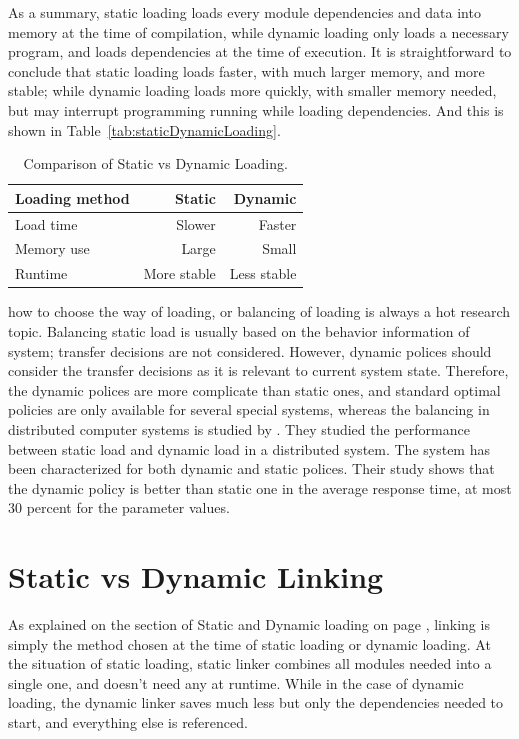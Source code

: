 \documentclass[doc,natbib,12pt]{apa6}
\begin{document}
	As a summary, static loading loads every module dependencies and data into memory at the time of compilation, while dynamic loading only loads a necessary program, and loads dependencies at the time of execution. It is straightforward to conclude that static loading loads faster, with much larger memory, and more stable; while dynamic loading loads more quickly, with smaller memory needed, but may interrupt programming running while loading dependencies. And this is shown in Table~\vref{tab:staticDynamicLoading}.
	
	\begin{table}[h]
		\centering
		\begin{tabular}{l|rr}
			Loading method & Static & Dynamic \\\hline
			Load time & Slower  & Faster\\
			Memory use & Large & Small  \\
			Runtime & More stable & Less stable
		\end{tabular}
		\caption{\label{tab:staticDynamicLoading}Comparison of Static vs Dynamic Loading.}
	\end{table}
	
	how to choose the way of loading, or balancing of loading is always a hot research topic. Balancing static load is usually based on the behavior information of system; transfer decisions are not considered. However, dynamic polices should consider the transfer decisions as it is relevant to current system state. Therefore, the dynamic polices are more complicate than static ones, and standard optimal policies are only available for several special systems, whereas the balancing in distributed computer systems is studied by \cite{Kameda2000}. They studied the performance between static load and dynamic load in a distributed system. The system has been characterized for both dynamic and static polices. Their study shows that the dynamic policy is better than static one in the average response time, at most 30 percent for the parameter values.
	
	\newpage
	\section{Static vs Dynamic Linking} \label{chp:staticDynamicLinking}
	As explained on the section of Static and Dynamic loading on page \pageref{chp:staticDynamicLoading}, linking is simply the method chosen at the time of static loading or dynamic loading. At the situation of static loading, static linker combines all modules needed into a single one, and doesn't need any at runtime. While in the case of dynamic loading, the dynamic linker saves much less but only the dependencies needed to start, and everything else is referenced.
	
\end{document}
